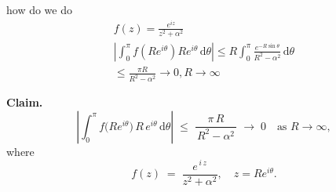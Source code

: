 \documentclass[12pt]{article}
\theoremstyle{definition} %
\theoremstyle{plain} %
\begin{document}
how do we do 
\begin{align}
    f(z)= \frac{e^{iz}}{z^{2}+\alpha^{2}} \\[10pt] 
    \left\vert \int_{0}^{\pi}f(Re^{i\theta})Re^{i\theta}  \,\mathrm{d}\theta  \right\vert \leq R \int_{0}^{\pi} \frac{e^{-R\sin \theta}}{R^{2}-\alpha^{2}} \,\mathrm{d}\theta \\[10pt] 
    \leq  \frac{\pi R}{R^{2}-\alpha^{2}}\to 0, R \to \infty 
\end{align}

\noindent
\textbf{Claim.} 
\[
\left|
\int_{0}^{\pi} f\bigl(Re^{i\theta}\bigr)\,R\,e^{i\theta}\,\mathrm{d}\theta
\right|
\;\le\;
\frac{\pi\,R}{\,R^2 - \alpha^2\,}
\;\longrightarrow\;0 
\quad
\text{as } R \to \infty,
\]
where
\[
f(z) \;=\; \frac{e^{\,i\,z}}{z^{2}+\alpha^{2}}, 
\quad
z = Re^{i\theta}.
\]
\end{document}
